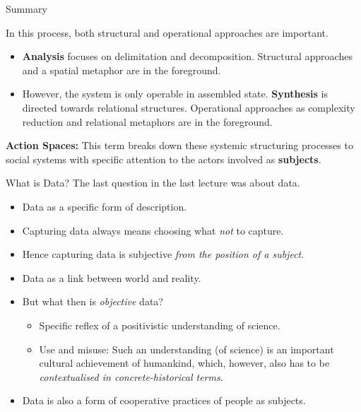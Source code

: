 \documentclass{beamer}
\begin{document}
\begin{frame}{Summary}

In this process, both structural and operational approaches are important.
\begin{itemize}
\item \textbf{Analysis} focuses on delimitation and decomposition.  Structural
  approaches and a spatial metaphor are in the foreground.
\item However, the system is only operable in assembled state.
  \textbf{Synthesis} is directed towards relational structures. Operational
  approaches as complexity reduction and relational metaphors are in the
  foreground.
\end{itemize}

\textbf{Action Spaces:} This term breaks down these systemic structuring
processes to social systems with specific attention to the actors involved as
\textbf{subjects}.
\end{frame}

\begin{frame}{What is Data?}
The last question in the last lecture was about data. 
  
  \begin{itemize}
  \item Data as a specific form of description.
  \item Capturing data always means choosing what \emph{not} to capture.
  \item Hence capturing data is subjective \emph{from the position of a
    subject}.
  \item Data as a link between world and reality.
  \item But what then is \emph{objective} data?
    \begin{itemize}
    \item Specific reflex of a positivistic understanding of science.
    \item Use and misuse: Such an understanding (of science) is an important
      cultural achievement of humankind, which, however, also has to be
      \emph{contextualised in concrete-historical terms}.
    \end{itemize}
  \item Data is also a form of cooperative practices of people as subjects.
  \end{itemize}
\end{frame}
\end{document}
